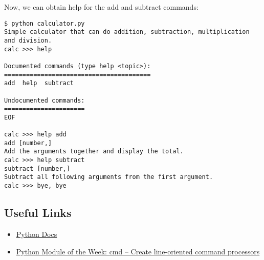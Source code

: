 Now, we can obtain help for the add and subtract commands:

\begin{lstlisting}
$ python calculator.py
Simple calculator that can do addition, subtraction, multiplication and division.
calc >>> help

Documented commands (type help <topic>):
========================================
add  help  subtract

Undocumented commands:
======================
EOF

calc >>> help add
add [number,]
Add the arguments together and display the total.
calc >>> help subtract
subtract [number,]
Subtract all following arguments from the first argument.
calc >>> bye, bye
\end{lstlisting}

\subsection{Useful Links}\label{useful-links}

\begin{itemize}
\tightlist
\item
  \href{https://docs.python.org/2/library/cmd.html}{Python Docs}
\item
  \href{https://pymotw.com/2/cmd/}{Python Module of the Week: cmd --
  Create line-oriented command processors}
\end{itemize}
